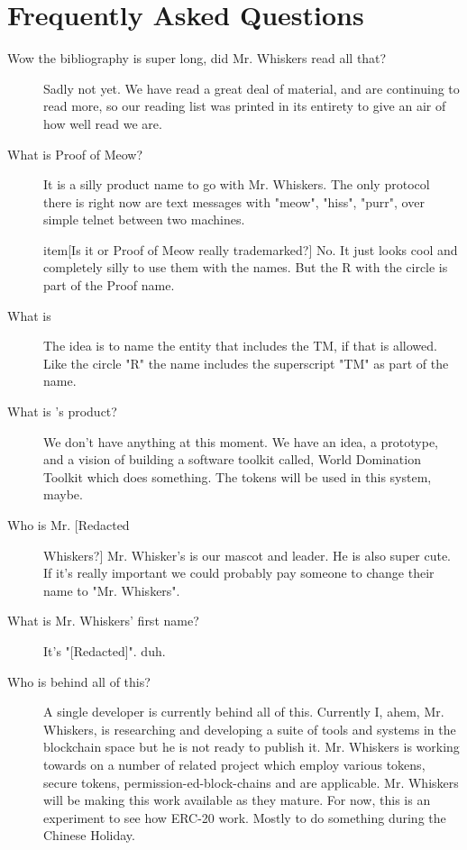 
\section{Frequently Asked Questions}
\begin{description}
    \item[Wow the bibliography is super long, did Mr. Whiskers read all that?] Sadly not yet. We have read a great deal of material, and are continuing to read more, so our reading list was printed in its entirety to give an air of how well read we are.
    
    \item[What is Proof of Meow\textsuperscript{\textregistered}?] It is a silly product name to go with Mr. Whiskers. The only protocol there is right now are text messages with "meow", "hiss", "purr", over simple telnet between two machines. 
    
    item[Is it \compu or Proof of Meow\textsuperscript{\textregistered} really trademarked?] No. It just looks cool and completely silly to use them with the names. But the R with the circle is part of the Proof name.
    
    \item[What is \compu{}] The idea is to name the entity that includes the TM, if that is allowed. Like the circle "R" the name includes the superscript "TM" as part  of the name. 
    
    \item[What is \compu{}'s product?] We don't have anything at this moment. We have an idea, a prototype, and a vision of building a software toolkit called, World Domination Toolkit\textsuperscript{\textregistered} which does something. The tokens will be used in this system, maybe. 
    
    \item[Who is Mr. [Redacted] Whiskers?] Mr. Whisker's is our mascot and leader. He is also super cute. If it's really important we could probably pay someone to change their name to "Mr. Whiskers".  
    
    \item[What is Mr. Whiskers' first name?] It's "[Redacted]". duh.
    
    \item[Who is behind all of this?] A single developer is currently behind all of this. Currently I, ahem, Mr. Whiskers, is researching and developing a suite of tools and systems in the blockchain space but he is not ready to publish it. Mr. Whiskers is working towards on a number of related project which employ various tokens, secure tokens, permission-ed-block-chains and are applicable.  Mr. Whiskers will be making this work available as they mature. For now, this is an experiment to see how ERC-20 work.  Mostly to do something during the Chinese Holiday. 


\end{description}
